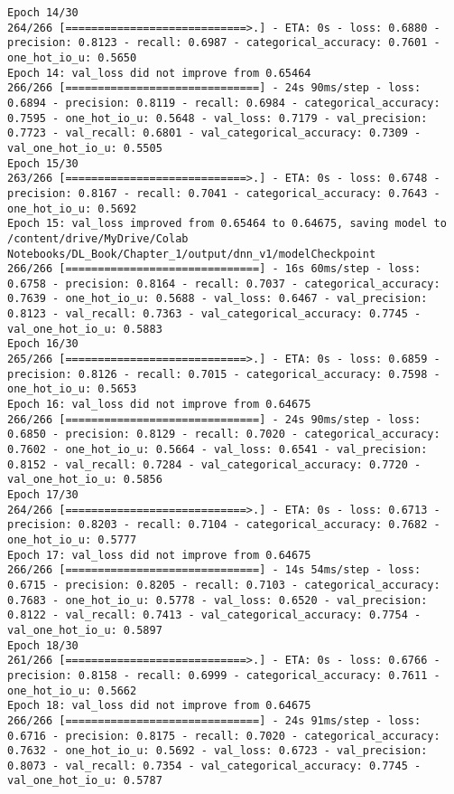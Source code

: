 \documentclass[
  letterpaper,
  DIV=11,
  numbers=noendperiod]{scrreprt}
\begin{document}
\begin{verbatim}
Epoch 14/30
264/266 [============================>.] - ETA: 0s - loss: 0.6880 - precision: 0.8123 - recall: 0.6987 - categorical_accuracy: 0.7601 - one_hot_io_u: 0.5650
Epoch 14: val_loss did not improve from 0.65464
266/266 [==============================] - 24s 90ms/step - loss: 0.6894 - precision: 0.8119 - recall: 0.6984 - categorical_accuracy: 0.7595 - one_hot_io_u: 0.5648 - val_loss: 0.7179 - val_precision: 0.7723 - val_recall: 0.6801 - val_categorical_accuracy: 0.7309 - val_one_hot_io_u: 0.5505
Epoch 15/30
263/266 [============================>.] - ETA: 0s - loss: 0.6748 - precision: 0.8167 - recall: 0.7041 - categorical_accuracy: 0.7643 - one_hot_io_u: 0.5692
Epoch 15: val_loss improved from 0.65464 to 0.64675, saving model to /content/drive/MyDrive/Colab Notebooks/DL_Book/Chapter_1/output/dnn_v1/modelCheckpoint
266/266 [==============================] - 16s 60ms/step - loss: 0.6758 - precision: 0.8164 - recall: 0.7037 - categorical_accuracy: 0.7639 - one_hot_io_u: 0.5688 - val_loss: 0.6467 - val_precision: 0.8123 - val_recall: 0.7363 - val_categorical_accuracy: 0.7745 - val_one_hot_io_u: 0.5883
Epoch 16/30
265/266 [============================>.] - ETA: 0s - loss: 0.6859 - precision: 0.8126 - recall: 0.7015 - categorical_accuracy: 0.7598 - one_hot_io_u: 0.5653
Epoch 16: val_loss did not improve from 0.64675
266/266 [==============================] - 24s 90ms/step - loss: 0.6850 - precision: 0.8129 - recall: 0.7020 - categorical_accuracy: 0.7602 - one_hot_io_u: 0.5664 - val_loss: 0.6541 - val_precision: 0.8152 - val_recall: 0.7284 - val_categorical_accuracy: 0.7720 - val_one_hot_io_u: 0.5856
Epoch 17/30
264/266 [============================>.] - ETA: 0s - loss: 0.6713 - precision: 0.8203 - recall: 0.7104 - categorical_accuracy: 0.7682 - one_hot_io_u: 0.5777
Epoch 17: val_loss did not improve from 0.64675
266/266 [==============================] - 14s 54ms/step - loss: 0.6715 - precision: 0.8205 - recall: 0.7103 - categorical_accuracy: 0.7683 - one_hot_io_u: 0.5778 - val_loss: 0.6520 - val_precision: 0.8122 - val_recall: 0.7413 - val_categorical_accuracy: 0.7754 - val_one_hot_io_u: 0.5897
Epoch 18/30
261/266 [============================>.] - ETA: 0s - loss: 0.6766 - precision: 0.8158 - recall: 0.6999 - categorical_accuracy: 0.7611 - one_hot_io_u: 0.5662
Epoch 18: val_loss did not improve from 0.64675
266/266 [==============================] - 24s 91ms/step - loss: 0.6716 - precision: 0.8175 - recall: 0.7020 - categorical_accuracy: 0.7632 - one_hot_io_u: 0.5692 - val_loss: 0.6723 - val_precision: 0.8073 - val_recall: 0.7354 - val_categorical_accuracy: 0.7745 - val_one_hot_io_u: 0.5787

\end{verbatim}
\end{document}
